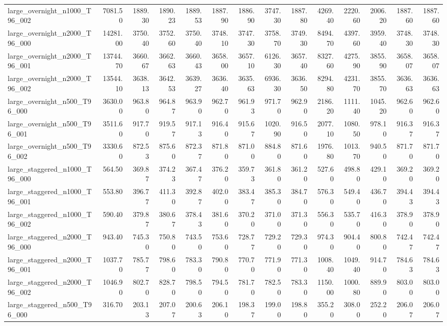 \begin{table}[htbp]
\begin{tabular}{lrrrrrrrrrrrrr}
large\_overnight\_n1000\_T96\_002 & 7081.50 & 1889.30 & 1890.23 & 1889.53 & 1887.90 & 1886.90 & 3747.30 & 1887.80 & 4269.40 & 2220.60 & 2006.20 & 1887.60 & 1887.60 \\
large\_overnight\_n2000\_T96\_000 & 14281.00 & 3750.40 & 3752.60 & 3750.40 & 3748.10 & 3747.30 & 3758.70 & 3749.30 & 8494.70 & 4397.60 & 3959.40 & 3748.30 & 3748.30 \\
large\_overnight\_n2000\_T96\_001 & 13744.70 & 3660.67 & 3662.63 & 3660.43 & 3658.00 & 3657.10 & 6126.30 & 3657.40 & 8327.60 & 4275.90 & 3855.90 & 3658.07 & 3658.07 \\
large\_overnight\_n2000\_T96\_002 & 13544.10 & 3638.13 & 3642.53 & 3639.27 & 3636.40 & 3635.63 & 6936.30 & 3636.50 & 8294.80 & 4231.70 & 3855.70 & 3636.63 & 3636.63 \\
large\_overnight\_n500\_T96\_000 & 3630.00 & 963.80 & 964.87 & 963.90 & 962.70 & 961.93 & 971.70 & 962.90 & 2186.20 & 1111.40 & 1045.20 & 962.60 & 962.60 \\
large\_overnight\_n500\_T96\_001 & 3511.60 & 917.70 & 919.57 & 917.13 & 916.40 & 915.67 & 1020.90 & 916.50 & 2077.10 & 1080.50 & 978.10 & 916.37 & 916.37 \\
large\_overnight\_n500\_T96\_002 & 3330.60 & 872.53 & 875.60 & 872.37 & 871.80 & 871.00 & 884.80 & 871.60 & 1976.80 & 1013.70 & 940.50 & 871.70 & 871.70 \\
large\_staggered\_n1000\_T96\_000 & 564.50 & 369.87 & 374.23 & 367.47 & 376.20 & 359.73 & 361.80 & 361.20 & 527.60 & 498.80 & 429.10 & 369.20 & 369.20 \\
large\_staggered\_n1000\_T96\_001 & 553.80 & 396.77 & 411.30 & 392.87 & 402.00 & 383.47 & 385.30 & 384.70 & 576.30 & 549.40 & 436.70 & 394.43 & 394.43 \\
large\_staggered\_n1000\_T96\_002 & 590.40 & 379.87 & 380.67 & 378.43 & 381.60 & 370.20 & 371.00 & 371.30 & 556.30 & 535.70 & 416.30 & 378.90 & 378.90 \\
large\_staggered\_n2000\_T96\_000 & 943.40 & 745.30 & 750.80 & 743.50 & 753.60 & 728.77 & 729.20 & 729.30 & 974.30 & 904.40 & 800.80 & 742.47 & 742.47 \\
large\_staggered\_n2000\_T96\_001 & 1037.70 & 785.77 & 798.60 & 783.30 & 790.80 & 770.70 & 771.90 & 771.30 & 1008.40 & 1049.40 & 914.70 & 784.63 & 784.63 \\
large\_staggered\_n2000\_T96\_002 & 1046.90 & 802.70 & 828.70 & 798.50 & 794.50 & 781.70 & 782.50 & 783.30 & 1150.00 & 1000.80 & 889.90 & 803.00 & 803.00 \\
large\_staggered\_n500\_T96\_000 & 316.70 & 203.13 & 207.07 & 200.63 & 206.10 & 198.37 & 199.00 & 198.80 & 355.20 & 308.00 & 252.20 & 206.07 & 206.07 \\

\end{tabular}
\end{table}
